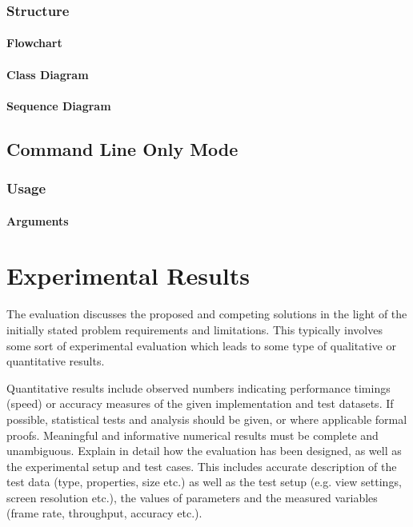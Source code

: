 \documentclass[11pt, a4paper,oneside,chapterprefix=false]{scrbook}
\begin{document}
\subsection{Structure}
\subsubsection{Flowchart}
\subsubsection{Class Diagram}
\subsubsection{Sequence Diagram}
\section{Command Line Only Mode}
\subsection{Usage}
\subsubsection{Arguments}


\chapter{Experimental Results} \label{chp:experiments}

The evaluation discusses the proposed and competing solutions in the light of the initially stated problem requirements and limitations. This typically involves some sort of experimental evaluation which leads to some type of qualitative or quantitative results.

Quantitative results include observed numbers indicating performance timings (speed) or accuracy measures of the given implementation and test datasets. If possible, statistical tests and analysis should be given, or where applicable formal proofs. Meaningful and informative numerical results must be complete and unambiguous. Explain in detail how the evaluation has been designed, as well as the experimental setup and test cases. This includes accurate description of the test data (type, properties, size etc.) as well as the test setup (e.g. view settings, screen resolution etc.), the values of parameters and the measured variables (frame rate, throughput, accuracy etc.).
\end{document}
